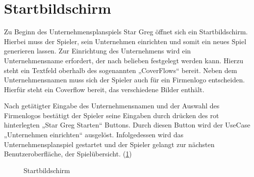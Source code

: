 \section{Startbildschirm}
\label{sec:ui-startbildschirm}

Zu Beginn des Unternehmensplanspiels Star Greg öffnet sich ein Startbildschirm. Hierbei muss der Spieler, sein Unternehmen einrichten und somit ein neues Spiel generieren lassen. Zur Einrichtung des Unternehmens wird ein Unternehmensname erfordert, der nach belieben festgelegt werden kann. Hierzu steht ein Textfeld oberhalb des sogenannten „CoverFlows“ bereit. Neben dem Unternehmensnamen muss sich der Spieler auch für ein Firmenlogo entscheiden. Hierfür steht ein Coverflow bereit, das verschiedene Bilder enthält.
 
Nach getätigter Eingabe des Unternehmensnamen und der Auswahl des Firmenlogos bestätigt der Spieler seine Eingaben durch drücken des rot hinterlegten „Star Greg Starten“ Buttons. Durch diesen Button wird der UseCase „Unternehmen einrichten“ ausgelöst. Infolgedessen wird das Unternehmensplanspiel gestartet und der Spieler gelangt zur nächsten Benutzeroberfläche, der Spielübersicht. (\ref{img:ui-startbildschirm})

\begin{figure}[htb]
  \centering
  \caption{Startbildschirm}
  \label{img:ui-startbildschirm}
\end{figure}

\autorende{}
 